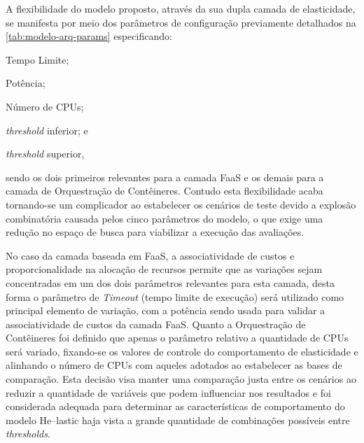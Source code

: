 \documentclass[english,brazilian]{UNISINOSmonografia} %
\begin{document}
A flexibilidade do modelo proposto, através da sua dupla camada de elasticidade, se manifesta por meio dos parâmetros de configuração previamente detalhados na \autoref{tab:modelo-arq-params} especificando: 
\begin{inparaenum} 
	\item Tempo Limite;
	\item Potência;
	\item Número de CPUs;
	\item \textit{threshold} inferior; e
	\item \textit{threshold} superior,
\end{inparaenum} sendo os dois primeiros relevantes para a camada FaaS e os demais para a camada de Orquestração de Contêineres.
Contudo esta flexibilidade acaba tornando-se um complicador ao estabelecer os cenários de teste devido a explosão combinatória causada pelos cinco parâmetros do modelo, o que exige uma redução no espaço de busca para viabilizar a execução das avaliações.


No caso da camada baseada em FaaS, a associatividade de custos e proporcionalidade na alocação de recursos permite que as variações sejam concentradas em um dos dois parâmetros relevantes para esta camada, desta forma o parâmetro de \textit{Timeout} (tempo limite de execução) será utilizado como principal elemento de variação, com a potência sendo usada para validar a associatividade de custos da camada FaaS.
Quanto a Orquestração de Contêineres foi definido que apenas o parâmetro relativo a quantidade de CPUs será variado, fixando-se os valores de controle do comportamento de elasticidade e alinhando o número de CPUs com aqueles adotados ao estabelecer as bases de comparação.
Esta decisão visa manter uma comparação justa entre os cenários ao reduzir a quantidade de variáveis que podem influenciar nos resultados e foi considerada adequada para determinar as características de comportamento do modelo \textsf{He}--lastic haja vista a grande quantidade de combinações possíveis entre \textit{thresholds}.
\end{document}
